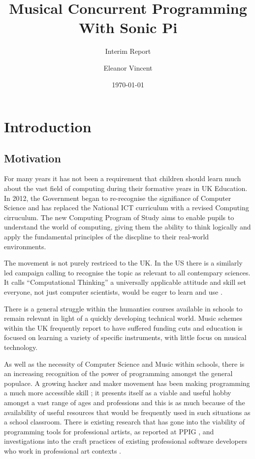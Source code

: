 \documentclass[11pt]{scrartcl}
\begin{document}
\title{Musical Concurrent Programming \\ With Sonic Pi}
\subtitle{Interim Report}
\author{Eleanor Vincent}
\date{\today}
\maketitle
\newpage

\tableofcontents
\newpage

\section{Introduction}

\subsection{Motivation}
For many years it has not been a requirement that children should learn much
about the vast field of computing during their formative years in UK 
Education. In 2012, the Government began to re-recognise the signifiance of 
Computer Science and has replaced the National ICT curriculum with a revised 
Computing cirruculum. The new Computing Program of Study \cite{DfE13} aims to 
enable pupils to understand the world of computing, giving them the ability to 
think logically and apply the fundamental principles of the discpline to their 
real-world environments.

The movement is not purely restriced to the UK. In the US there is a similarly 
led campaign calling to recognise the topic as relevant to all contempary 
sciences. It calls ``Computational Thinking'' a universally applicable 
attitude and skill set everyone, not just computer scientists, would be eager 
to learn and use \cite{Wing06}.

There is a general struggle within the humanties courses available in schools to 
remain relevant in light of a quickly developing technical world. Music schemes 
within the UK frequently report to have suffered funding cuts and education is 
focused on learning a variety of specific instruments, with little focus on 
musical technology.

As well as the necessity of Computer Science and Music within schools, there 
is an increasing recognition of the power of programming amongst the general 
populace. A growing hacker and maker movement has been making programming a 
much more accessible skill \cite{BAD14}; it presents itself as a viable and 
useful hobby amongst a vast range of ages and professions and this is as much 
because of the availability of useful resources that would be frequently used 
in such situations as a school classroom. There is existing research that has 
gone into the viability of programming tools for professional artists, as 
reported at PPIG \cite{Ch12,BC05}, and investigations into the craft practices 
of existing professional software developers who work in professional art 
contexts \cite{W10}.
\end{document}
